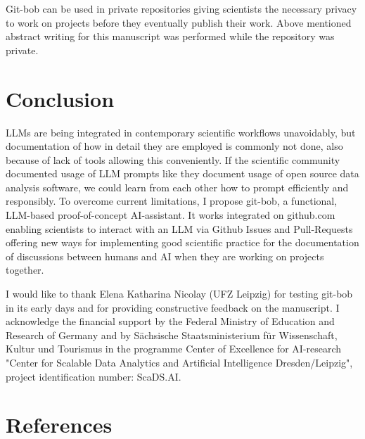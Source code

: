 \documentclass[times, twoside]{zHenriquesLab-StyleBioRxiv}
\begin{document}
Git-bob can be used in private repositories giving scientists the necessary privacy to work on projects before they eventually publish their work. Above mentioned abstract writing for this manuscript was performed while the repository was private.


\section*{Conclusion}

LLMs are being integrated in contemporary scientific workflows unavoidably, but documentation of how in detail they are employed is commonly not done, also because of lack of tools allowing this conveniently. If the scientific community documented usage of LLM prompts like they document usage of open source data analysis software, we could learn from each other how to prompt efficiently and responsibly. To overcome current limitations, I propose git-bob, a functional, LLM-based proof-of-concept AI-assistant. It works integrated on github.com enabling scientists to interact with an LLM via Github Issues and Pull-Requests offering new ways for implementing good scientific practice for the documentation of discussions between humans and AI when they are working on projects together.

\begin{acknowledgements}

I would like to thank Elena Katharina Nicolay (UFZ Leipzig) for testing git-bob in its early days and for providing constructive feedback on the manuscript. I acknowledge the financial support by the Federal Ministry of Education and Research of Germany and by Sächsische Staatsministerium für Wissenschaft, Kultur und Tourismus in the programme Center of Excellence for AI-research "Center for Scalable Data Analytics and Artificial Intelligence Dresden/Leipzig", project identification number: ScaDS.AI.

\end{acknowledgements}

\section*{References}


\onecolumn
\newpage
\end{document}
